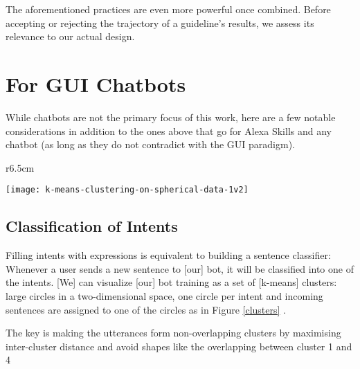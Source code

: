 The aforementioned practices are even more powerful once combined. Before accepting or rejecting the trajectory of a guideline's results, we assess its relevance to our actual design.






\section{For GUI Chatbots}





While chatbots are not the primary focus of this work, here are a few notable considerations in addition to the ones above that go for Alexa Skills and any chatbot (as long as they do not contradict with the GUI paradigm).




\hspace*{-\parindent}%
\begin{minipage}[H]{\linewidth}

\begin{wrapfigure}{r}{6.5cm}
	\caption[K-means Clusters Example] {K-means Clusters of Utterances, based on Deschamps \cite{botbestbractis}}
	\label{clusters}
	\centering
	\texttt{[image: k-means-clustering-on-spherical-data-1v2]} 
\end{wrapfigure}




\subsection*{Classification of Intents}
Filling intents with expressions is equivalent to building a sentence classifier: Whenever a user sends a new sentence to [our] bot, it will be classified into one of the intents. [We] can visualize [our] bot training as a set of [k-means] clusters: large circles  in a two-dimensional space, one circle per intent and incoming sentences are assigned to one of the circles as in Figure \ref{clusters} \cite{botbestbractis}.

The key is making the utterances form non-overlapping clusters by maximising inter-cluster distance and avoid shapes like the overlapping between cluster 1 and 4

\end{minipage}


